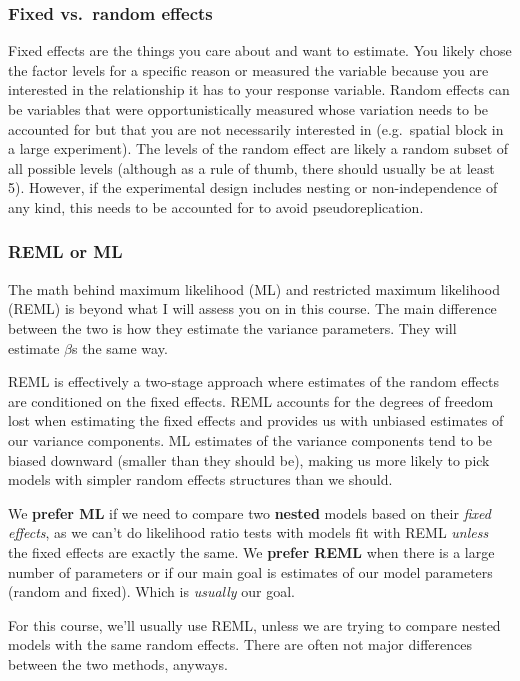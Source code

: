 \documentclass[
  openany]{book}
\begin{document}
\hypertarget{fixed-vs.-random-effects}{%
\subsubsection{Fixed vs.~random effects}\label{fixed-vs.-random-effects}}

Fixed effects are the things you care about and want to estimate. You likely chose the factor levels for a specific reason or measured the variable because you are interested in the relationship it has to your response variable.
Random effects can be variables that were opportunistically measured whose variation needs to be accounted for but that you are not necessarily interested in (e.g.~spatial block in a large experiment). The levels of the random effect are likely a random subset of all possible levels (although as a rule of thumb, there should usually be at least 5). However, if the experimental design includes nesting or non-independence of any kind, this needs to be accounted for to avoid pseudoreplication.

\hypertarget{reml}{%
\subsubsection{REML or ML}\label{reml}}

The math behind maximum likelihood (ML) and restricted maximum likelihood (REML) is beyond what I will assess you on in this course. The main difference between the two is how they estimate the variance parameters. They will estimate \(\beta\)s the same way.

REML is effectively a two-stage approach where estimates of the random effects are conditioned on the fixed effects. REML accounts for the degrees of freedom lost when estimating the fixed effects and provides us with unbiased estimates of our variance components. ML estimates of the variance components tend to be biased downward (smaller than they should be), making us more likely to pick models with simpler random effects structures than we should.

We \textbf{prefer ML} if we need to compare two \textbf{nested} models based on their \emph{fixed effects}, as we can't do likelihood ratio tests with models fit with REML \emph{unless} the fixed effects are exactly the same. We \textbf{prefer REML} when there is a large number of parameters or if our main goal is estimates of our model parameters (random and fixed). Which is \emph{usually} our goal.

For this course, we'll usually use REML, unless we are trying to compare nested models with the same random effects. There are often not major differences between the two methods, anyways.
\end{document}

